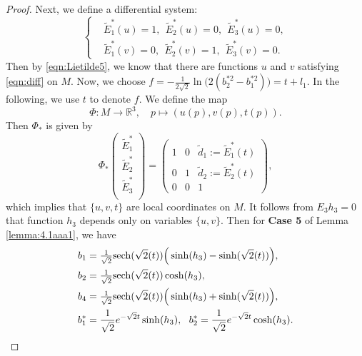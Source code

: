 \documentclass[reqno]{amsart}%
\theoremstyle{definition}
\numberwithin{equation}{section}
\begin{document}
\begin{proof}
Next, we define a differential system:
\begin{equation}\label{eqn:diff}
\left\{
\begin{aligned}
&\tilde{E}_1^*(u)=1,\ \ \tilde{E}_2^*(u)=0,\ \ \tilde{E}_3^*(u)=0,\\
&\tilde{E}_1^*(v)=0,\ \ \tilde{E}_2^*(v)=1,\ \ \tilde{E}_3^*(v)=0.
\end{aligned}\right.
\end{equation}
Then by \eqref{eqn:Lietilde5}, we know that there are functions $u$ and $v$ satisfying \eqref{eqn:diff} on $M$. Now, we choose %
$f=-\frac{1}{2\sqrt{2}}\ln\Big(2(b_2^{*2}-b_1^{*2})\Big)=t+l_1$.
In the following, we use $t$ to denote $f$.
We define the map
$$
\Phi: M \longrightarrow \mathbb{R}^{3},
\quad p \mapsto(u(p),v(p),t(p)).
$$
Then $\Phi_*$ is given by
\begin{equation}\label{eqn:dPhi5}
\Phi_*\left(
        \begin{array}{c}
          \tilde{E}_1^* \\
          \tilde{E}_2^* \\
          \tilde{E}_3^* \\
        \end{array}
      \right)
=\left(\begin{array}{cccc}
1 & 0 & \tilde{d}_1:=\tilde{E}_1^*(t) \\
0 & 1 & \tilde{d}_2:=\tilde{E}_2^*(t) \\
0 & 0 & 1
\end{array}\right),
\end{equation}
which implies that $\{u,v,t\}$ are
local coordinates on $M$. It follows from $E_3h_3=0$ that function $h_3$ depends only on variables $\{u,v\}$. Then for {\bf Case 5} of Lemma \ref{lemma:4.1aaa1},
we have
%
\begin{equation}\label{eqn:bijth5}
\begin{aligned}
b_1&=\tfrac{1}{\sqrt{2}}{\rm sech}(\sqrt{2}(t))\Big(\sinh (h_3)-\sinh(\sqrt{2}(t))\Big),\\
b_2&=\tfrac{1}{\sqrt{2}}{\rm sech}(\sqrt{2}(t))\cosh (h_3) ,\\
b_4&=\tfrac{1}{\sqrt{2}}{\rm sech}(\sqrt{2}(t))\Big(\sinh (h_3)+\sinh(\sqrt{2}(t))\Big),\\
b_1^*&=\frac{1}{\sqrt{2}}e^{-\sqrt{2}t}\sinh(h_3),\ \
b_2^*=\frac{1}{\sqrt{2}}e^{-\sqrt{2}t}\cosh(h_3).
\end{aligned}
\end{equation}


\end{proof}
\end{document}
